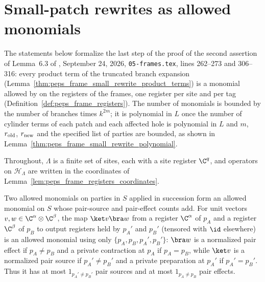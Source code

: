 \section{Small-patch rewrites as allowed monomials}
\label{sec:peps_small_rewrite_monomials}
The statements below formalize the last step of the proof of the second
assertion of Lemma~6.3 of \cite{OpenAI2026PolynomialPEPS}, September 24, 2026,
\texttt{05-frames.tex}, lines 262--273 and 306--316: every product term of the
truncated branch expansion
(Lemma~\ref{thm:peps_frame_small_rewrite_product_terms}) is a monomial
allowed by \cite[Theorem~5.2]{OpenAI2026PolynomialPEPS} on the registers of the
frames, one register per site and per tag
(Definition~\ref{def:peps_frame_registers}). The number of monomials is bounded
by the number of branches times $k^{2m}$; it is polynomial in $L$ once the
number of cylinder terms of each patch and each affected hole is polynomial in $L$ and $m$,
$r_{\rm old}$, $r_{\rm new}$ and the specified list of parties are bounded,
as shown in
Lemma~\ref{thm:peps_frame_small_rewrite_polynomial}.

Throughout, $\Lambda$ is a finite set of sites, each with a site register
$\C^q$, and operators on $\mathcal H_\Lambda$ are written in the
coordinates of Lemma~\ref{lem:peps_frame_registers_coordinates}.

\begin{lemma}
    \label{lem:peps_rank_one_chain}
    \leanok
    Two allowed monomials on parties in $S$ applied in succession form an allowed
    monomial on $S$ whose pair-source and pair-effect counts add.
    For unit vectors $v,w\in\C^\alpha\otimes\C^\beta$, the map $\ket v\bra w$ from a register
    $\C^\alpha$ of $p_A$ and a register $\C^\beta$ of $p_B$ to output registers held by $p_A'$ and $p_B'$
    (tensored with $\id$ elsewhere) is an allowed monomial using only
    $\{p_A,p_B,p_A',p_B'\}$: $\bra w$ is a normalized pair effect if
    $p_A\ne p_B$ and a private contraction at $p_A$ if $p_A=p_B$, while
    $\ket v$ is a normalized pair source if $p_A'\ne p_B'$ and a private
    preparation at $p_A'$ if $p_A'=p_B'$. Thus it has at most $1_{p_A'\ne p_B'}$ pair sources and at most $1_{p_A\ne p_B}$ pair effects.
\end{lemma}

